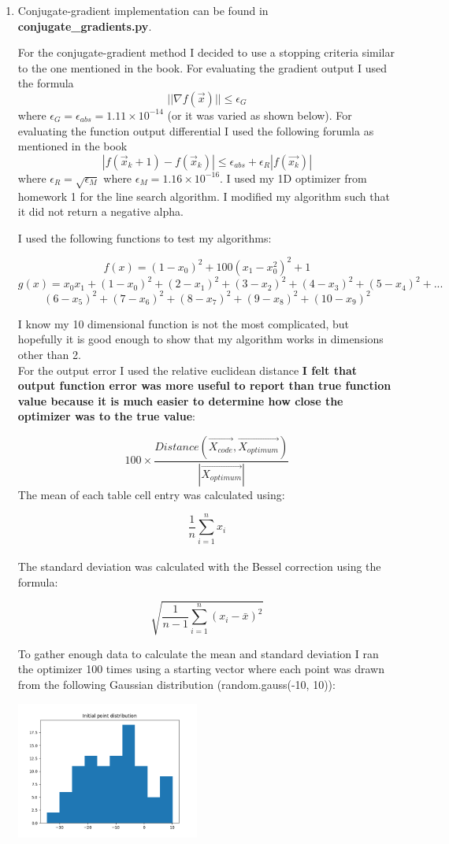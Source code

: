 \documentclass[11pt]{article}
\begin{document}
\begin{enumerate}
\item 
Conjugate-gradient implementation can be found in {\bf conjugate\_gradients.py}.

For the conjugate-gradient method I decided to use a stopping criteria similar to the one mentioned in the book. For evaluating the gradient output I used the formula $$|| \nabla f(\vec{x}) || \le \epsilon_{G}$$ where $ \epsilon_{G} = \epsilon_{abs} = 1.11 \times 10^{-14}$ (or it was varied as shown below). For evaluating the function output differential I used the following forumla as mentioned in the book $$ |f(\vec{x}_{k} + 1) - f(\vec{x}_{k})| \le \epsilon_{abs} + \epsilon_{R} | f(\vec{x_{k}}) | $$ where $\epsilon_{R} = \sqrt{\epsilon_{M}}$ where $\epsilon_{M} = 1.16 \times 10^{-16}$.
I used my 1D optimizer from homework 1 for the line search algorithm. I modified my algorithm such that it did not return a negative alpha. 

I used the following functions to test my algorithms:

$$ f(x) = (1 - x_0)^2 + 100(x_1 - x_0^2)^2 + 1 $$
$$ g(x) = x_0x_1 + (1-x_0)^2 + (2-x_1)^2+ (3-x_2)^2+ (4-x_3)^2+ (5-x_4)^2+ ... $$
$$ (6-x_5)^2+ (7-x_6)^2+ (8-x_7)^2+ (9-x_8)^2+ (10-x_9)^2 $$

I know my 10 dimensional function is not the most complicated, but hopefully it is good enough to show that my algorithm works in dimensions other than 2.
\\
For the output error I used the relative euclidean distance {\bf I felt that output function error was more useful to report than true function value because it is much easier to determine how close the optimizer was to the true value}:

$$ 100 \times \frac{Distance(\vec{X_{code}}, \vec{X_{optimum}})}{| \vec{X_{optimum}} |} $$
The mean of each table cell entry was calculated using:

$$\frac{1}{n} \sum_{i=1}^{n} x_{i}$$
\\
The standard deviation was calculated with the Bessel correction using the formula:

$$\sqrt{ \frac{1}{n - 1} \sum_{i = 1}^{n} (x_{i} - \bar{x})^2}$$

To gather enough data to calculate the mean and standard deviation I ran the optimizer 100 times using a starting vector where each point was drawn from the following Gaussian distribution (random.gauss(-10, 10)):

\includegraphics[width=6cm]{initial_point_dist.png}


\end{enumerate}
\end{document}
